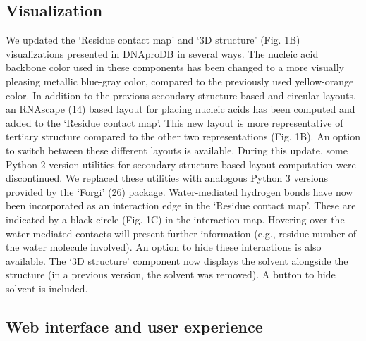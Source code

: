 \subsection{Visualization}
We updated the ‘Residue contact map’ and ‘3D structure’ (Fig. 1B) visualizations presented in DNAproDB in several ways. The nucleic acid backbone color used in these components has been changed to a more visually pleasing metallic blue-gray color, compared to the previously used yellow-orange color. 
In addition to the previous secondary-structure-based and circular layouts, an RNAscape (14) based layout for placing nucleic acids has been computed and added to the ‘Residue contact map’. This new layout is more representative of tertiary structure compared to the other two representations (Fig. 1B). An option to switch between these different layouts is available.
During this update, some Python 2 version utilities for secondary structure-based layout computation were discontinued. We replaced these utilities with analogous Python 3 versions provided by the ‘Forgi’ (26) package. 
Water-mediated hydrogen bonds have now been incorporated as an interaction edge in the ‘Residue contact map’. These are indicated by a black circle (Fig. 1C) in the interaction map. Hovering over the water-mediated contacts will present further information (e.g., residue number of the water molecule involved). An option to hide these interactions is also available. The ‘3D structure’ component now displays the solvent alongside the structure (in a previous version, the solvent was removed). A button to hide solvent is included. 

\subsection{Web interface and user experience}

